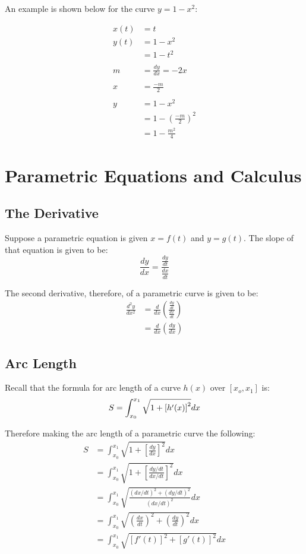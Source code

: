 An example is shown below for the curve $y=1-x^2$:

\begin{align*}
  x(t) &= t\\
  y(t) &= 1-x^2\\
       &= 1-t^2\\\\
  m &= \frac{dy}{dx}=-2x\\\\
  x &= \frac{-m}{2}\\\\
  y &= 1-x^2\\
    &= 1-(\frac{-m}{2})^2\\
    &= 1-\frac{m^2}{4}
\end{align*}

\section{Parametric Equations and Calculus}
\subsection{The Derivative}
Suppose a parametric equation is given $x=f(t)$ and $y=g(t)$. The slope of that
equation is given to be:
\begin{equation}
  \frac{dy}{dx}=\frac{\frac{dy}{dt}}{\frac{dx}{dt}}
\end{equation}

The second derivative, therefore, of a parametric curve is given to be:
\begin{equation}\begin{aligned}
  \frac{d^2y}{dx^2} &=
  \frac{d}{dx}\left(\frac{\frac{dy}{dt}}{\frac{dx}{dt}}\right)\\
  &= \frac{d}{dx}\left(\frac{dy}{dx}\right)
\end{aligned}\end{equation}

\subsection{Arc Length}
Recall that the formula for arc length of a curve $h(x)$ over $[x_o, x_1]$ is:
\begin{equation}
  S = \int_{x_0}^{x_1} \sqrt{1+\left[h'(x)\right]^2} dx\\
\end{equation}

Therefore making the arc length of a parametric curve the following:
\begin{align*}
  S &= \int_{x_0}^{x_1} \sqrt{1+\left[\frac{dy}{dx}\right]^2} dx\\
    &= \int_{x_0}^{x_1} \sqrt{1+\left[\frac{dy/dt}{dx/dt}\right]^2} dx\\
    &= \int_{x_0}^{x_1} \sqrt{\frac{(dx/dt)^2+(dy/dt)^2}{(dx/dt)^2}} dx\\
    &= \int_{x_0}^{x_1}
  \sqrt{\left(\frac{dx}{dt}\right)^2+\left(\frac{dy}{dt}\right)^2} dx\\
    &= \int_{x_0}^{x_1} \sqrt{[f'(t)]^2+[g'(t)]^2} dx\\
\end{align*}

